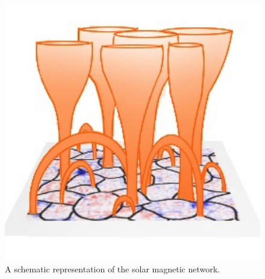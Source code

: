 \documentclass[physics,article,submit,pdftex,moreauthors]{Definitions/mdpi}
\begin{document}

\begin{figure}[h]\label{magneticnetwork}
\centering
\includegraphics[scale=0.3]{solar-network-v1.jpg}
\caption{A schematic representation of the solar magnetic network. 
}
\end{figure}
\end{document}

